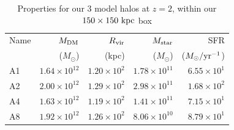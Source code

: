 \begin{table}
\caption{Properties for our 3 model halos at $z=2$, within our $150 \times 150\ \rm kpc$ box}
\centering
\begin{tabular}{l r r r r}
Name & $M_{\rm DM}$ & $R_{\rm vir}$ & $M_{\rm star}$ & SFR \\
   & ($M_\odot$) & (kpc) & ($M_\odot$) & ($M_\odot / \rm yr ^{-1}$)\\ \hline
A1 & $1.64\times 10^{12}$ & $1.20 \times 10^2$  & $1.78 \times 10^{11}$ & $6.55\times10^1$ \\ \hline
A2 & $2.00\times 10^{12}$ & $1.29 \times 10^2$  & $2.98 \times 10^{11}$ & $1.68\times10^2$ \\ \hline
A4 & $1.63\times 10^{12}$ & $1.19 \times 10^2$  & $1.41 \times 10^{11}$ & $7.15\times10^1$ \\ \hline
A8 & $1.92\times 10^{12}$ & $1.26 \times 10^2$ & $8.06 \times 10 ^{10}$ & $8.79\times10^1$ \\
\hline
\end{tabular}
\label{table:sims5}
\end{table}

